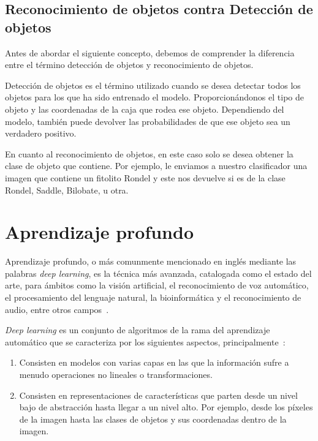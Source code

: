 \subsection{Reconocimiento de objetos contra Detección de objetos}

Antes de abordar el siguiente concepto, debemos de comprender la diferencia entre el término detección de objetos y reconocimiento de objetos.

Detección de objetos es el término utilizado cuando se desea detectar todos los objetos para los que ha sido entrenado el modelo. Proporcionándonos el tipo de objeto y las coordenadas de la caja que rodea ese objeto. Dependiendo del modelo, también puede devolver las probabilidades de que ese objeto sea un verdadero positivo.

En cuanto al reconocimiento de objetos, en este caso solo se desea obtener la clase de objeto que contiene. Por ejemplo, le enviamos a nuestro clasificador una imagen que contiene un fitolito Rondel y este nos devuelve si es de la clase Rondel, Saddle, Bilobate, u otra.

\section{Aprendizaje profundo}

Aprendizaje profundo, o más comunmente mencionado en inglés mediante las palabras \textit{deep learning}, es la técnica más avanzada, catalogada como el estado del arte, para ámbitos como la visión artificial, el reconocimiento de voz automático, el procesamiento del lenguaje natural,  la bioinformática y el reconocimiento de audio, entre otros campos~\cite{ms:deeplearning}.

\textit{Deep learning} es un conjunto de algoritmos de la rama del aprendizaje automático que se caracteriza por los siguientes aspectos, principalmente~\cite{ms:deeplearning}:

\begin{enumerate}
	\item Consisten en modelos con varias capas en las que la información sufre a menudo operaciones no lineales o transformaciones.
	\item Consisten en representaciones de características que parten desde un nivel bajo de abstracción hasta llegar a un nivel alto. Por ejemplo, desde los píxeles de la imagen hasta las clases de objetos y sus coordenadas dentro de la imagen.
\end{enumerate}

